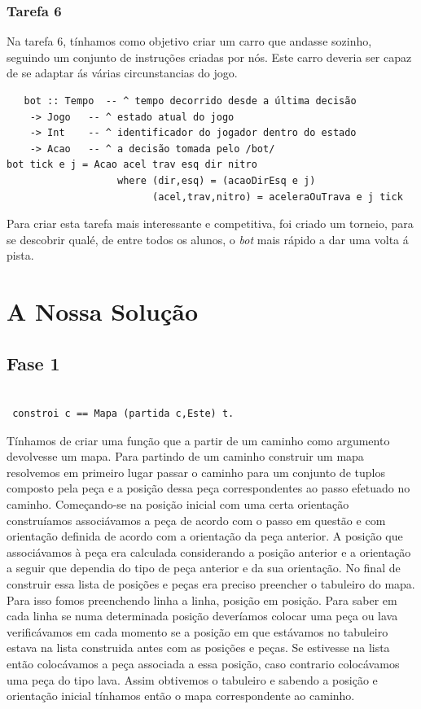 \documentclass[a4paper]{report} %
\begin{document}
\subsection{Tarefa 6}

Na tarefa 6, tínhamos como objetivo criar um carro que andasse sozinho, seguindo um conjunto de instruções criadas por nós. Este carro deveria ser capaz de se adaptar ás várias circunstancias do jogo.

 \begin{verbatim} 
   bot :: Tempo  -- ^ tempo decorrido desde a última decisão
    -> Jogo   -- ^ estado atual do jogo
    -> Int    -- ^ identificador do jogador dentro do estado
    -> Acao   -- ^ a decisão tomada pelo /bot/
bot tick e j = Acao acel trav esq dir nitro
                   where (dir,esq) = (acaoDirEsq e j)
                         (acel,trav,nitro) = aceleraOuTrava e j tick                      

\end{verbatim}

Para criar esta tarefa mais interessante e competitiva, foi criado um torneio, para se descobrir qualé, de entre todos os alunos, o \textit{bot} mais rápido a dar uma volta á pista.

\chapter{A Nossa Solução}
\label{sec:solucao}

\section{Fase 1}


\begin{verbatim}

 constroi c == Mapa (partida c,Este) t.

\end{verbatim}


Tínhamos de criar uma função que a partir de um caminho como argumento devolvesse um mapa.
Para partindo de um caminho construir um mapa resolvemos em primeiro lugar passar o caminho para um conjunto de tuplos composto pela peça e a posição dessa peça correspondentes ao passo efetuado no caminho. Começando-se na posição inicial com uma certa orientação construíamos associávamos a peça de acordo com o passo em questão e com orientação definida de acordo com a orientação da peça anterior. A posição que associávamos à peça era calculada considerando a posição anterior e a orientação a seguir que dependia do tipo de peça anterior e da sua orientação. No final de construir essa lista de posições e peças era preciso preencher o tabuleiro do mapa. Para isso fomos preenchendo linha a linha, posição em posição. Para saber em cada linha se numa determinada posição deveríamos colocar uma peça ou lava verificávamos em cada momento se a posição em que estávamos no tabuleiro estava na lista construida antes com as posições e peças. Se estivesse na lista então colocávamos a peça associada a essa posição, caso contrario colocávamos uma peça do tipo lava. Assim obtivemos o tabuleiro e sabendo a posição e orientação inicial tínhamos então o mapa correspondente ao caminho.    
\end{document}
